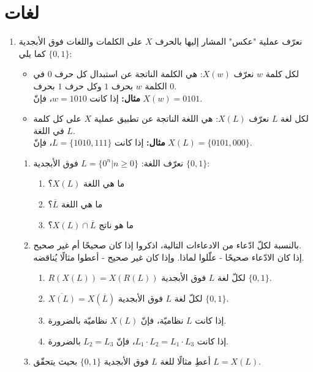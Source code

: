 \documentclass[14pt]{extarticle}
\begin{document}
\pagestyle{empty}
\thispagestyle{empty}

\section*{لغات}
\begin{enumerate}[label=(\Alph*)]
    \item
    نعرّف عملية "عكس" المشار إليها بالحرف $X$ على الكلمات واللغات فوق الأبجدية $\{0,1\}$ كما يلي:
\begin{itemize}
    \item لكل كلمة $w$ نعرّف $X(w)$: هي الكلمة الناتجة عن استبدال كل حرف $0$ في الكلمة $w$ بحرف $1$ وكل حرف $1$ بحرف $0$. \\
    \textbf{مثال:} إذا كانت $w = 1010$، فإنّ $X(w) = 0101$.
    \item لكل لغة $L$ نعرّف $X(L)$: هي اللغة الناتجة عن تطبيق عملية $X$ على كل كلمة في اللغة $L$. \\
    \textbf{مثال:} إذا كانت $L = \{1010, 111\}$، فإنّ $X(L) = \{0101, 000\}$.
\end{itemize}
\begin{enumerate}[label=(\Roman*)]
    \item نعرّف اللغة: $L = \{0^n | n \geq 0\}$ فوق الأبجدية $\{0,1\}$:
    \begin{enumerate}[label=(\arabic*)]
        \item ما هي اللغة $X(L)$؟
        \item ما هي اللغة $\overline{L}$؟
        \item ما هو ناتج $X(L) \cap \overline{L}$؟
    \end{enumerate}
    \item
بالنسبة لكلّ ادّعاء من الادعاءات التالية، اذكروا إذا كان صحيحًا أم غير صحيح. \\
إذا كان الادّعاء صحيحًا - علّلوا لماذا.
وإذا كان غير صحيح - أعطوا مثالًا يُناقضه.
\begin{enumerate}[label=(\arabic*)]
    \item $R(X(L)) = X(R(L))$ لكلّ لغة $L$ فوق الأبجدية $\{0,1\}$.
    \item $\overline{X(L)} = X(\overline{L})$ لكلّ لغة $L$ فوق الأبجدية $\{0,1\}$.
    \item إذا كانت $L$ نظاميّة، فإنّ $X(L)$ نظاميّة بالضرورة.
    \item إذا كانت $L_1 \cdot L_2 = L_1 \cdot L_3$، فإنّ $L_2 = L_3$ بالضرورة.
\end{enumerate}
\item أعطِ مثالًا للغة $L$ فوق الأبجدية $\{0,1\}$ بحيث يتحقّق $L = X(L)$.

\end{enumerate}
\end{enumerate}
\end{document}

